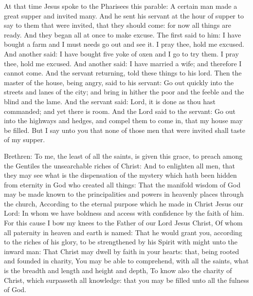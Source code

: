 \begin{multicols}{2}

At that time Jesus spoke to the Pharisees this parable:
A certain man made a great supper and invited many.  And he
sent his servant at the hour of supper to say to them that were invited, that
they should come: for now all things are ready.  And they began all at once to
make excuse. The first said to him: I have bought a farm and I must needs go
out and see it. I pray thee, hold me excused.  And another said: I have bought
five yoke of oxen and I go to try them. I pray thee, hold me excused.  And
another said: I have married a wife; and therefore I cannot come.  And the
servant returning, told these things to his lord.  Then the master of the
house, being angry, said to his servant: Go out quickly into the streets and
lanes of the city; and bring in hither the poor and the feeble and the blind
and the lame.  And the servant said: Lord, it is done as thou hast commanded;
and yet there is room.  And the Lord said to the servant: Go out into the
highways and hedges, and compel them to come in, that my house may be filled.
But I say unto you that none of those men that were invited shall taste of my
supper.


\bigskip



Brethren: To me, the least of all the saints, is given this grace, to preach
among the Gentiles the unsearchable riches of Christ:
And to enlighten all men, that they may see what is the
dispensation of the mystery which hath been hidden from eternity in God
who created all things:
That the manifold wisdom of God may be made known to the
principalities and powers in heavenly places through the church,
According to the eternal purpose which he made in Christ Jesus our
Lord:
In whom we have boldness and access with confidence by the faith
of him.
For this cause I bow my knees to the Father of our Lord Jesus
Christ,
Of whom all paternity in heaven and earth is named:
That he would grant you, according to the riches of his glory, to
be strengthened by his Spirit with might unto the inward man:
That Christ may dwell by faith in your hearts: that, being rooted
and founded in charity,
You may be able to comprehend, with all the saints, what is the
breadth and length and height and depth,
To know also the charity of Christ, which surpasseth all
knowledge: that you may be filled unto all the fulness of God.




\end{multicols}
